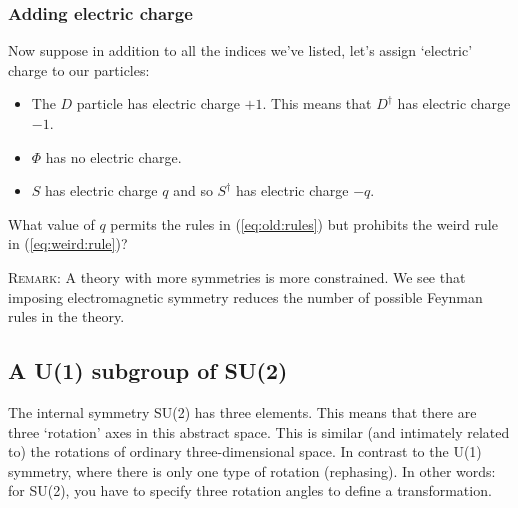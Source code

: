 \documentclass[12pt]{article}
\begin{document}
\subsubsection{Adding electric charge}

Now suppose in addition to all the indices we've listed, let's assign `electric' charge to our particles:
\begin{itemize}
	\item The $D$ particle has electric charge $+1$. This means that $D^\dag$ has electric charge $-1$.
	\item $\Phi$ has no electric charge.
	\item $S$ has electric charge $q$ and so $S^\dag$ has electric charge $-q$.
\end{itemize}
What value of $q$ permits the rules in  (\ref{eq:old:rules}) but prohibits the weird rule in (\ref{eq:weird:rule})?

\textsc{Remark}: A theory with more symmetries is more constrained. We see that imposing electromagnetic symmetry reduces the number of possible Feynman rules in the theory.



\subsection{A U(1) subgroup of SU(2)}

The internal symmetry SU(2) has three elements. This means that there are three `rotation' axes in this abstract space. This is similar (and intimately related to) the rotations of ordinary three-dimensional space. In contrast to the U(1) symmetry, where there is only one type of rotation (rephasing). In other words: for SU(2), you have to specify three rotation angles to define a transformation.
\end{document}
